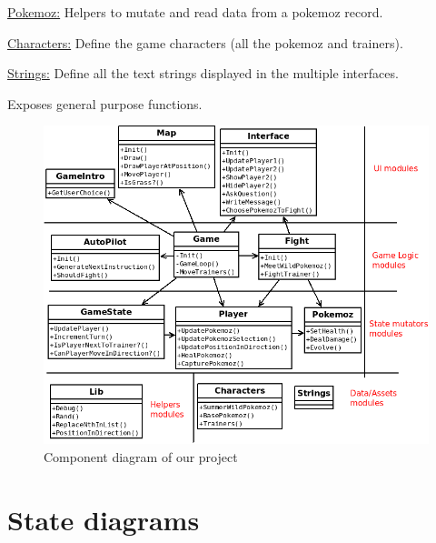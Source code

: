 \documentclass[10pt, a4paper]{article}
\begin{document}
\begin{description}
\begin{description}
     \item \underline{Pokemoz:} Helpers to mutate and read data from a pokemoz record.
    \end{description}
  \item[Data/assets modules] \hfill
    \begin{description}
     \item \underline{Characters:} Define the game characters (all the pokemoz and trainers).
     \item \underline{Strings:} Define all the text strings displayed in the multiple interfaces.
    \end{description}
  \item[Lib module] Exposes general purpose functions.
\end{description}

\bigskip
\bigskip
\bigskip
\bigskip


\begin{figure}[!ht]

\includegraphics[width=\linewidth]{Diagramme1.png}
\caption{Component diagram of our project}
\end{figure}


\clearpage

\section{State diagrams}
\end{document}
